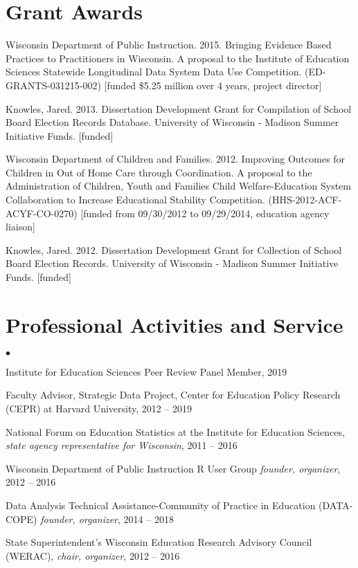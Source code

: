 \documentclass[margin,line]{res}
\newenvironment{list2}{
  \begin{list}{$\bullet$}{%
      \setlength{\itemsep}{0in}
      \setlength{\parsep}{0in} \setlength{\parskip}{0in}
      \setlength{\topsep}{0in} \setlength{\partopsep}{0in} 
      \setlength{\leftmargin}{0.2in}}}{\end{list}}
\begin{document}
\begin{resume}
\section{\sc Grant Awards}

Wisconsin Department of Public Instruction. 2015. Bringing Evidence Based 
Practices to Practitioners in Wisconsin. A proposal to the Institute of Education 
Sciences Statewide Longitudinal Data System Data Use Competition. (ED-GRANTS-031215-002) 
[funded \$5.25 million over 4 years, project director]

Knowles, Jared. 2013. Dissertation Development Grant for Compilation of School Board Election Records Database. University of Wisconsin - Madison Summer Initiative Funds. [funded]

Wisconsin Department of Children and Families. 2012. Improving Outcomes for Children in Out of Home Care through Coordination. A proposal to the Administration of Children, Youth and Families 
 Child Welfare-Education System Collaboration to Increase Educational Stability Competition. (HHS-2012-ACF-ACYF-CO-0270) [funded from 09/30/2012 to 09/29/2014, education agency liaison]

Knowles, Jared. 2012. Dissertation Development Grant for Collection of School Board Election Records. University of Wisconsin - Madison Summer Initiative Funds. [funded]


\section{\sc Professional Activities and Service}
% 
\begin{list2}
\item Institute for Education Sciences Peer Review Panel Member, 2019
\item Faculty Advisor, Strategic Data Project, Center for Education Policy Research (CEPR) at Harvard University, 2012 -- 2019
\item National Forum on Education Statistics at the Institute for Education Sciences, \emph{state agency representative for Wisconsin}, 2011 -- 2016
\item Wisconsin Department of Public Instruction R User Group \emph{founder, organizer}, 
2012 -- 2016 
\item Data Analysis Technical Assistance-Community of Practice in Education 
(DATA-COPE) \emph{founder, organizer}, 2014 -- 2018
\item State Superintendent's Wisconsin Education Research Advisory Council (WERAC), 
\emph{chair, organizer}, 2012 -- 2016
\end{list2}



\end{resume}
\end{document}
